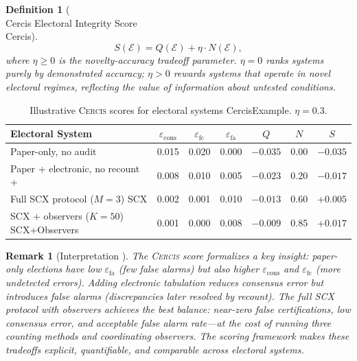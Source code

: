 \documentclass[11pt,a4paper]{article}
\newtheorem{definition}[theorem]{Definition}
\newtheorem{remark}[theorem]{Remark}
\theoremstyle{definition}
\newcommand{\Cercis}{\textsc{Cercis}}
\begin{document}
\begin{definition}[\\Cercis{} Electoral Integrity Score \\Cercis{}]
\label{def:cercis_electoral}
\begin{equation}
    S(\mathcal{E}) = Q(\mathcal{E}) + \eta \cdot N(\mathcal{E}),
    \label{eq:cercis_electoral}
\end{equation}
where $\eta \geq 0$ is the novelty-accuracy tradeoff parameter. $\eta = 0$ ranks systems purely by demonstrated accuracy; $\eta > 0$ rewards systems that operate in novel electoral regimes, reflecting the value of information about untested conditions.
\end{definition}
\begin{table}[htbp]
\centering
\caption{Illustrative \Cercis{} scores for electoral systems CercisExample. $\eta = 0.3$.}
\label{tab:cercis_electoral}
\begin{tabular}{lcccccc}
\toprule
Electoral System  & $\varepsilon_{\text{cons}}$ & $\varepsilon_{\text{fc}}$ & $\varepsilon_{\text{fa}}$ & $Q$ & $N$ & $S$ \\
\midrule
Paper-only, no audit  & 0.015 & 0.020 & 0.000 & $-0.035$ & 0.00 & $-0.035$ \\
Paper + electronic, no recount + & 0.008 & 0.010 & 0.005 & $-0.023$ & 0.20 & $-0.017$ \\
Full SCX protocol ($M=3$) SCX & 0.002 & 0.001 & 0.010 & $-0.013$ & 0.60 & $+0.005$ \\
SCX + observers ($K=50$) SCX+Observers & 0.001 & 0.000 & 0.008 & $-0.009$ & 0.85 & $+0.017$ \\
\bottomrule
\end{tabular}
\end{table}
\begin{remark}[Interpretation ]
\label{rem:cercis_interpretation}
The \Cercis{} score formalizes a key insight: paper-only elections have low $\varepsilon_{\text{fa}}$ (few false alarms) but also higher $\varepsilon_{\text{cons}}$ and $\varepsilon_{\text{fc}}$ (more undetected errors). Adding electronic tabulation reduces consensus error but introduces false alarms (discrepancies later resolved by recount). The full SCX protocol with observers achieves the best balance: near-zero false certifications, low consensus error, and acceptable false alarm rate---at the cost of running three counting methods and coordinating observers. The scoring framework makes these tradeoffs explicit, quantifiable, and comparable across electoral systems.
\end{remark}
\end{document}
